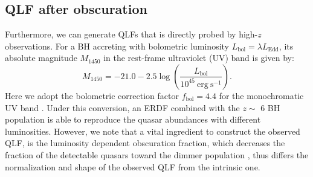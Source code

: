 \documentclass[nolinenumbers,preprint2,tighten]{aastex631}
\newcommand{\Muv}{M_{1450}}
\newcommand{\Lbol}{L_\mathrm{bol}}
\newcommand{\fbol}{f_\mathrm{bol}}
\begin{document}
\begin{CJK*}{UTF8}{gbsn}
\subsection{QLF after obscuration}\label{sec:LF}
Furthermore, we can generate QLFs that is directly probed by high-$z$ observations.
For a BH accreting with bolometric luminosity $\Lbol=\lambda L_\mathrm{Edd}$, 
its absolute magnitude $\Muv$ in the rest-frame ultraviolet (UV) band is given by:
\begin{equation}
  \label{eq:M1450}
  \Muv= -21.0-2.5 \log  \left(\frac{\Lbol}{10^{45}~\mathrm{erg~s}^{-1}} \right).
\end{equation}
Here we adopt the bolometric correction factor $\fbol=4.4$ for the monochromatic UV band \citep{2006ApJS..166..470R}.
Under this conversion, an ERDF combined with the $z\sim$ 6 BH population is able to reproduce 
the quasar abundances with different luminosities. 
However, we note that a vital ingredient to construct the observed QLF, 
is the luminosity dependent obscuration fraction, 
which decreases the fraction of the detectable quasars toward the dimmer population 
\citep{2003ApJ...598..886U,2014ApJ...786..104U,2008A&A...490..905H,2014MNRAS.437.3550M}, 
thus differs the normalization and shape of the observed QLF from the intrinsic one.


\end{CJK*}
\end{document}

